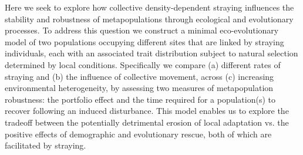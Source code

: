 \documentclass{revtex4}
\begin{document}

% 

Here we seek to explore how collective density-dependent straying influences the stability and robustness of metapopulations through ecological and evolutionary processes.
To address this question we construct a minimal eco-evolutionary model of two populations occupying different sites that are linked by straying individuals, each with an associated trait distribution subject to natural selection determined by local conditions.
Specifically we compare (a) different rates of straying and (b) the influence of collective movement, across (c) increasing environmental heterogeneity, by assessing two measures of metapopulation robustness: the portfolio effect and the time required for a population(s) to recover following an induced disturbance. 
This model enables us to explore the tradeoff between the potentially detrimental erosion of local adaptation vs. the positive effects of demographic and evolutionary rescue, both of which are facilitated by straying. %
\end{document}
